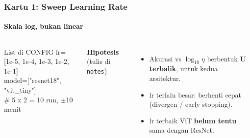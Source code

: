 \documentclass[t,aspectratio=169,xcolor={dvipsnames,table}]{beamer}
\begin{document}
\begin{frame}
    \frametitle{Kartu 1: Sweep Learning Rate}
    \framesubtitle{Skala log, bukan linear}
    \footnotesize

    \begin{columns}[T]
        \begin{block}{List di CONFIG}
            {\ttfamily\scriptsize lr=[1e-5, 1e-4, 1e-3, 1e-2, 1e-1]\\model=["resnet18", "vit\_tiny"]\\\# 5 x 2 = 10 run, $\pm$10 menit}
        \end{block}
        \textbf{Hipotesis} (tulis di \texttt{notes})
        \begin{itemize}
            \item Akurasi vs $\log_{10}\eta$ berbentuk \textbf{U terbalik}, untuk kedua arsitektur.
            \item lr terlalu besar: berhenti cepat (divergen / early stopping).
            \item lr terbaik ViT \textbf{belum tentu} sama dengan ResNet.
        \end{itemize}


\end{columns}
\end{frame}
\end{document}

